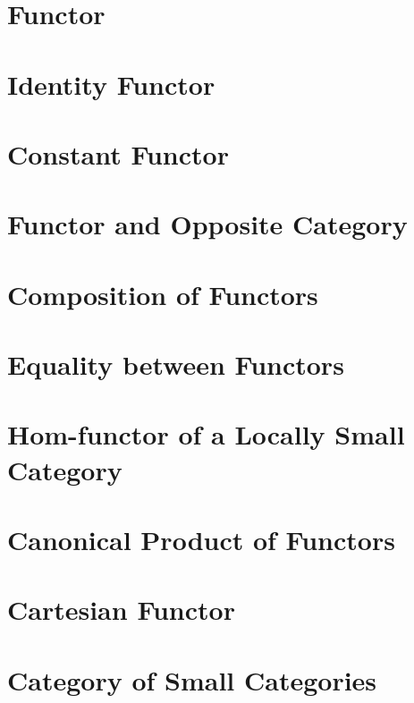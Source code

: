 \section{Functor}
    
\section{Identity Functor}
    
\section{Constant Functor}
    
\section{Functor and Opposite Category}
    
\section{Composition of Functors}
    
\section{Equality between Functors}
    
\section{Hom-functor of a Locally Small Category}
    
\section{Canonical Product of Functors}
    
\section{Cartesian Functor}
    
\section{Category of Small Categories}
    
